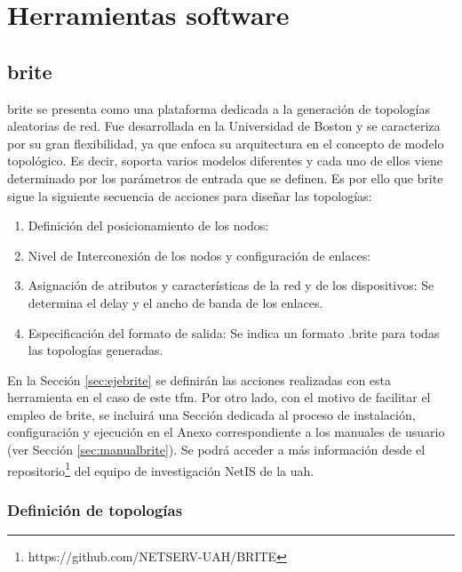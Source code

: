 \section{Herramientas software}
\label{sec:software}

\subsection{\acrshort{brite}}
\label{sec:brite}

\gls{brite} \cite{brite} se presenta como una plataforma dedicada a la generación de topologías aleatorias de red. Fue desarrollada en la Universidad de Boston y se caracteriza por su gran flexibilidad, ya que enfoca su arquitectura en el concepto de modelo topológico. Es decir, soporta varios modelos diferentes y cada uno de ellos viene determinado por los parámetros de entrada que se definen. Es por ello que \gls{brite} sigue la siguiente secuencia de acciones para diseñar las topologías:

\vspace{3mm}

\begin{enumerate}
    \item Definición del posicionamiento de los nodos:
    \item Nivel de Interconexión de los nodos y configuración de enlaces:
    \item Asignación de atributos y características de la red y de los dispositivos: Se determina el delay y el ancho de banda de los enlaces.
    \item Especificación del formato de salida: Se indica un formato .brite para todas las topologías generadas.
\end{enumerate}

\vspace{3mm}

En la Sección \ref{sec:ejebrite} se definirán las acciones realizadas con esta herramienta en el caso de este \gls{tfm}. Por otro lado, con el motivo de facilitar el empleo de \gls{brite}, se incluirá una Sección dedicada al proceso de instalación, configuración y ejecución en el Anexo correspondiente a los manuales de usuario (ver Sección \ref{sec:manualbrite}). Se podrá acceder a más información desde el repositorio\footnote{https://github.com/NETSERV-UAH/BRITE} del equipo de investigación NetIS de la \gls{uah}.

\subsubsection{Definición de topologías}
\label{sec:param}

